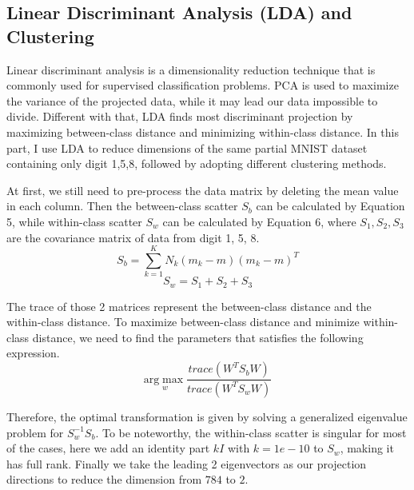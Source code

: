 \documentclass[a4paper,12pt]{article} %
\begin{document}
\subsection{Linear Discriminant Analysis (LDA) and Clustering}
\hspace{0.7cm}
Linear discriminant analysis is a dimensionality reduction technique that is commonly used for supervised classification problems. PCA is used to maximize the variance of the projected data, while it may lead our data impossible to divide. Different with that, LDA finds most discriminant projection by maximizing between-class distance and minimizing within-class distance.
In this part, I use LDA to reduce dimensions of the same partial MNIST dataset containing only digit 1,5,8, followed by adopting different clustering methods.

\hspace{0.7cm}
At first, we still need to pre-process the data matrix by deleting the mean value in each column. Then the between-class scatter $S_b$ can be calculated by Equation 5, while within-class scatter $S_w$ can be calculated by Equation 6, where $S_1, S_2, S_3$ are the covariance matrix of data from digit 1, 5, 8.
\begin{equation}
	S_b=\sum_{k=1}^K{N_k}\left( m_k-m \right) \left( m_k-m \right) ^T
\end{equation}
\begin{equation}
	S_w=S_1+S_2+S_3
\end{equation}

\hspace{0.7cm}
The trace of those 2 matrices represent the between-class distance and the within-class distance. To maximize between-class distance and minimize within-class distance, we need to find the parameters that satisfies the following expression.
\begin{equation*}
	\underset{w}{\mathrm{arg}\max}\frac{trace\left( W^TS_bW \right)}{trace\left( W^TS_wW \right)}
\end{equation*}

\hspace{0.7cm}
Therefore, the optimal transformation is given by solving a generalized eigenvalue problem for $S_w^{-1}S_b$. To be noteworthy, the within-class scatter is singular for most of the cases, here we add an identity part $kI$ with $k=1e-10$ to $S_w$, making it has full rank. Finally we take the leading 2 eigenvectors as our projection directions to reduce the dimension from $784$ to $2$.
\end{document}
